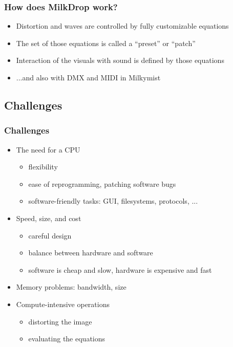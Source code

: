 \documentclass{beamer}
\begin{document}
\frame
{
  \frametitle{How does MilkDrop work?}

  \begin{itemize}
  \item Distortion and waves are controlled by fully customizable equations
  \item The set of those equations is called a ``preset'' or ``patch''
  \item Interaction of the visuals with sound is defined by those equations
  \item ...and also with DMX and MIDI in Milkymist
  \end{itemize}
}

\subsection{Challenges}
\frame
{
  \frametitle{Challenges}

  \begin{itemize}
  \item The need for a CPU
  \begin{itemize}
     \item flexibility
     \item ease of reprogramming, patching software bugs
     \item software-friendly tasks: GUI, filesystems, protocols, ...
  \end{itemize}
  \item Speed, size, and cost
  \begin{itemize}
     \item careful design
     \item balance between hardware and software
     \item software is cheap and slow, hardware is expensive and fast
  \end{itemize}
  \item Memory problems: bandwidth, size
  \item Compute-intensive operations
  \begin{itemize}
     \item distorting the image
     \item evaluating the equations
  \end{itemize}
  \end{itemize}
}
\end{document}
